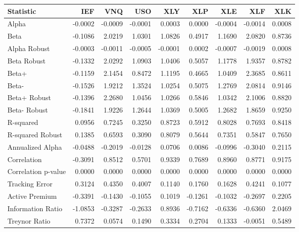 \begin{tabular}{lrrrrrrrr}
\toprule
Statistic & IEF & VNQ & USO & XLY & XLP & XLE & XLF & XLK \\
\midrule
Alpha & -0.0002 & -0.0009 & -0.0001 & 0.0003 & 0.0000 & -0.0004 & -0.0014 & 0.0008 \\
Beta & -0.1086 & 2.0219 & 1.0301 & 1.0826 & 0.4917 & 1.1690 & 2.0820 & 0.8736 \\
Alpha Robust & -0.0003 & -0.0011 & -0.0005 & -0.0001 & 0.0002 & -0.0007 & -0.0019 & 0.0008 \\
Beta Robust & -0.1332 & 2.0292 & 1.0903 & 1.0406 & 0.5057 & 1.1778 & 1.9357 & 0.8782 \\
Beta+ & -0.1159 & 2.1454 & 0.8472 & 1.1195 & 0.4665 & 1.0409 & 2.3685 & 0.8611 \\
Beta- & -0.1526 & 1.9212 & 1.3524 & 1.0254 & 0.5075 & 1.2769 & 2.0814 & 0.9146 \\
Beta+ Robust & -0.1396 & 2.2680 & 1.0456 & 1.0266 & 0.5846 & 1.0342 & 2.1006 & 0.8820 \\
Beta- Robust & -0.1841 & 1.9226 & 1.2644 & 1.0369 & 0.5005 & 1.2682 & 1.8659 & 0.9250 \\
R-squared & 0.0956 & 0.7245 & 0.3250 & 0.8723 & 0.5912 & 0.8028 & 0.7693 & 0.8418 \\
R-squared Robust & 0.1385 & 0.6593 & 0.3090 & 0.8079 & 0.5644 & 0.7351 & 0.5847 & 0.7650 \\
Annualized Alpha & -0.0488 & -0.2019 & -0.0128 & 0.0706 & 0.0086 & -0.0996 & -0.3040 & 0.2115 \\
Correlation & -0.3091 & 0.8512 & 0.5701 & 0.9339 & 0.7689 & 0.8960 & 0.8771 & 0.9175 \\
Correlation p-value & 0.0000 & 0.0000 & 0.0000 & 0.0000 & 0.0000 & 0.0000 & 0.0000 & 0.0000 \\
Tracking Error & 0.3124 & 0.4350 & 0.4007 & 0.1140 & 0.1760 & 0.1628 & 0.4241 & 0.1077 \\
Active Premium & -0.3391 & -0.1430 & -0.1055 & 0.1019 & -0.1261 & -0.1032 & -0.2697 & 0.2205 \\
Information Ratio & -1.0853 & -0.3287 & -0.2633 & 0.8936 & -0.7162 & -0.6336 & -0.6360 & 2.0469 \\
Treynor Ratio & 0.7372 & 0.0574 & 0.1490 & 0.3334 & 0.2704 & 0.1333 & -0.0051 & 0.5489 \\
\bottomrule
\end{tabular}
